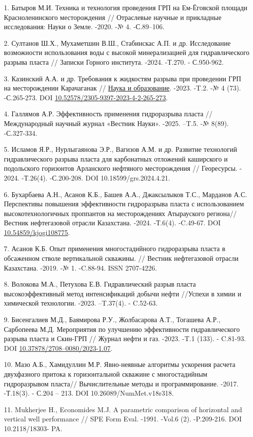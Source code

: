 \begin{refs}
1. Батыров М.И. Техника и технология проведения ГРП на Ем-Ёговской
площади Красноленинского месторождения // Отраслевые научные и
прикладные исследования: Науки о Земле. -2020. -№ 4. -С.89--106.

2. Султанов Ш.Х., Мухаметшин В.Ш., Стабинскас А.П. и др. Исследование
возможности использования воды с высокой минерализацией для
гидравлического разрыва пласта // Записки Горного института. -2024.
-Т.270. - С.950-962.

3. Казинский А.А. и др. Требования к жидкостям разрыва при проведении ГРП
на месторождении Карачаганак //
\href{https://ojs.wkau.kz/index.php/gbj/issue/view/79}{Наука и
образование}. -2023. -T.2. -№ 4 (73). -С.265-273. DOI
\href{https://doi.org/10.52578/2305-9397-2023-4-2-265-273}{10.52578/2305-9397-2023-4-2-265-273}.

4. Галлямов А.Р. Эффективность применения гидроразрыва пласта //
Международный научный журнал «Вестник Науки». -2025. --T.5. -№ 8(89).
-С.327-334.

5. Исламов Я.Р., Нурлыгаянова Э.Р., Вагизов А.М. и др. Развитие
технологий гидравлического разрыва пласта для карбонатных отложений
каширского и подольского горизонтов Арланского нефтяного месторождения
// Георесурсы. - 2024. -Т.26(4). -С.200-208. DOI
10.18599/grs.2024.4.21.

6. Бухарбаева А.Н., Асанов К.Б., Башев А.А., Джаксылыков Т.С., Марданов
А.С. Перспективы повышения эффективности гидроразрыва пласта с
использованием высокотехнологичных проппантов на месторождениях
Атырауского региона// Вестник нефтегазовой отрасли Казахстана. -2024.
-Т.6(4). -C.49-67. DOI
\href{https://doi.org/10.54859/kjogi108775}{10.54859/kjogi108775}.

7. Асанов К.Б. Опыт применения многостадийного гидроразрыва пласта в
обсаженном стволе вертикальной скважины. // Вестник нефтегазовой
отрасли Казахстана. -2019. -№ 1. -C.88-94. ISSN 2707-4226.

8. Волокова М.А., Петухова Е.В. Гидравлический разрыв пласта
высокоэффективный метод интенсификаций добычи нефти //Успехи в химии и
химической технологии. -2023. --T.37(4). - C.52-63.

9. Бисенгалиев М.Д., Баямирова Р.У., Жолбасарова А.Т., Тогашева А.Р.,
Сарбопеева М.Д. Мероприятия по улучшению эффективности гидравлического
разрыва пласта и Скин-ГРП // Журнал нефти и газ. -2023. -T.1 (133). -
C.81-93. DOI
\href{https://doi.org/10.37878/2708-0080/2023-1.07}{10.37878/2708--0080/2023-1.07}.

10. Мазо А.Б., Хамидуллин М.Р. Явно-неявные алгоритмы ускорения расчета
двухфазного притока к горизонтальной скважине с многостадийным
гидроразрывом пласта// Вычислительные методы и программирование.
-2017. -Т.18(3). - С.204 -- 213. DOI 10.26089/NumMet.v18r318.

11. Mukherjee H., Economides M.J. A parametric comparison of horizontal
and vertical well performance // SPE Form Eval. -1991. -Vol.6 (2).
-P.209-216. DOI 10.2118/18303- PA.
\end{refs}

